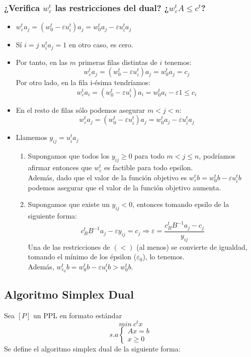 \documentclass[11pt,fleqn]{book} %
\begin{document}
\begin{itemize}
   \subsubsection{¿Verifica $w_\varepsilon^t$ las restricciones del dual? ¿$w_\varepsilon^t A \leq c^t$?}
   \begin{itemize}
		\item $w_\varepsilon^t a_j=(w_0^t-\varepsilon u_i ^t)a_j=w_0^ta_j-\varepsilon u_i^t a_j$
		\item Sí $i=j$ $u_i^t a_j=1$ en otro caso, es cero.
		\item Por tanto, en las $m$ primeras filas distintas de $i$ tenemos:
		$$
			w_\varepsilon^t a_j=(w_0^t-\varepsilon u_i ^t)a_j=w_0^ta_j=c_j
		$$
		Por otro lado, en la fila i-ésima tendríamos:
		$$
			w_\varepsilon^t a_i=(w_0^t-\varepsilon u_i ^t)a_i=w_0^ta_i-\varepsilon1\leq c_i
		$$
		\item En el resto de filas sólo podemos asegurar $m<j<n$:
		$$
			w_\varepsilon^t a_j=(w_0^t-\varepsilon u_i ^t)a_j=w_0^ta_j-\varepsilon u_i^t a_j
		$$
		\item Llamemos $y_{ij}=u_i^t a_{j}$
		\begin{enumerate}
			\item Supongamos que todos los $y_{ij}\geq 0$ para todo $m<j\leq n$, podríamos afirmar entonces que $w_\varepsilon^t$ es factible para todo epsilon. \\
			Además, dado que el valor de la función objetivo es $w_\varepsilon^t b = w_0^t b - \varepsilon u_i^tb$ podemos asegurar que el valor de la función objetivo aumenta.
			\item Supongamos que existe un $y_{ij}<0$, entonces tomando epsilo de la siguiente forma:
			$$ c_B^t B^{-1}a_j-\varepsilon y_{ij}=c_j \Rightarrow \varepsilon = \frac{c_B^t B^{-1}a_j-c_j}{y_{ij}} $$
			Una de las restricciones de $(<)$ (al menos) se convierte de igualdad, tomando el mínimo de los épsilon ($\varepsilon_0$), lo tenemos. \\
			Además, $w_{\varepsilon_0}^t b = w_0^t b - \varepsilon u_i^t b>w_0^t b $.
		\end{enumerate}
		
   \end{itemize}

	\subsection{Algoritmo Simplex Dual}
	Sea $[P]$ un PPL en formato estándar
	$$ min ~ c^t x $$
	$$ 
		s.a \left\{ 
				\begin{array}{c}
					Ax=b \\
					x\geq 0
				\end{array}
			\right.
	$$
	Se define el algoritmo simplex dual de la siguiente forma:
	

\end{itemize}
\end{document}
